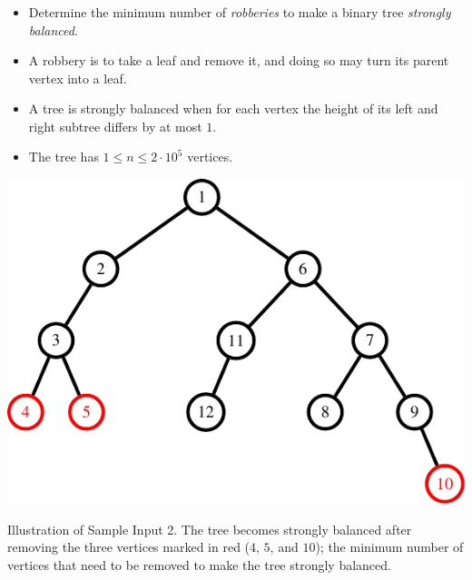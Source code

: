 \begin{frame}
    \frametitle{\problemtitle}

    \begin{itemize}
        \item Determine the minimum number of \emph{robberies} to make a binary
            tree \emph{strongly balanced}.
        \item A robbery is to take a leaf and remove it, and doing so may turn its parent vertex into a leaf.
        \item A tree is strongly balanced when for each vertex the height of its
            left and right subtree differs by at most $1$.
        \item The tree has $1 \leq n \leq 2 \cdot 10^5$ vertices.
    \end{itemize}

    \vspace{0.5em}

    \centering
    \includegraphics[height=0.4\textheight]{sample}

    \small
    Illustration of Sample Input 2.
    The tree becomes strongly balanced after removing the three vertices marked in red ($4$, $5$, and $10$);
    the minimum number of vertices that need to be removed to make the tree strongly balanced.
\end{frame}
